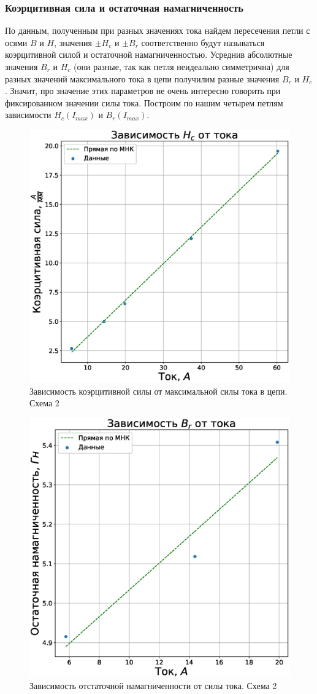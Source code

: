 \documentclass[a4paper,14pt]{extarticle}
\begin{document}
			\subsubsection{Коэрцитивная сила и остаточная намагниченность}
				По данным, полученным при разных значениях тока найдем пересечения петли с осями $B$ и $H$, значения $\pm H_c$ и $\pm B_r$ соответственно будут называться коэрцитивной силой и остаточной намагниченностью. Усреднив абсолютные значения $B_r$ и $H_c$ (они разные, так как петля неидеально симметрична) для разных значений максимального тока в цепи получилим разные значения $B_r$ и $H_c$. Значит, про значение этих параметров не очень интересно говорить при фиксированном значении силы тока. Построим по нашим четырем петлям зависимости $H_c(I_{max})$ и $B_r(I_{max})$.
				\begin{figure}[h]
					\centering
					\includegraphics[width=0.8\linewidth]{Lab2_6.eps}
					\caption{Зависимость коэрцитивной силы от максимальной силы тока в цепи. Схема 2}
					\label{fig9}
				\end{figure}
				\newpage
				\begin{figure}[h]
					\centering
					\includegraphics[width=0.8\linewidth]{Lab2_7.eps}
					\caption{Зависимость отстаточной намагниченности от силы тока. Схема 2}
					\label{fig9}
				\end{figure}
\end{document}

